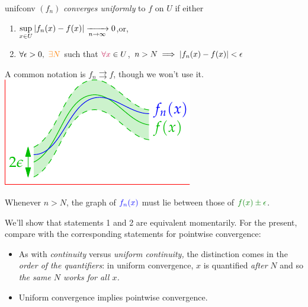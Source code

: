 \begin{defn}[lower separated=false, sidebyside, sidebyside align=top seam, sidebyside gap=0pt, righthand width=0.32\linewidth]{}{unifconv}
$(f_n)$ \emph{converges uniformly} to $f$ on $U$ if either
\begin{enumerate}
  \item $\displaystyle \sup\limits_{x\in U}\left| f_n(x)-f(x)\right|\xrightarrow[n\to\infty]{}0$,\quad or,
  \item $\forall \epsilon>0,\ \textcolor{orange}{\exists N}$ such that $\textcolor{purple}{\forall x}\in U$, $n>N\implies \left| f_n(x)-f(x)\right|<\epsilon$
\end{enumerate}
A common notation is $f_n\rightrightarrows f$, though we won't use it.
\tcblower
\flushright\includegraphics{unifconv1}
\end{defn}

Whenever $n>N$, the graph of $\textcolor{blue}{f_n(x)}$ must lie between those of $\textcolor{Green}{f(x)\pm\epsilon}$.\smallbreak

We'll show that statements 1 and 2 are equivalent momentarily. For the present, compare with the corresponding statements for pointwise convergence:
\begin{itemize}
  \item As with \emph{continuity} versus \emph{uniform continuity,} the distinction comes in the \emph{order of the quantifiers}: in uniform convergence, $x$ is quantified \emph{after} $N$ and so \emph{the same $N$ works for all $x$.}
  \item Uniform convergence implies pointwise convergence.
\end{itemize}

